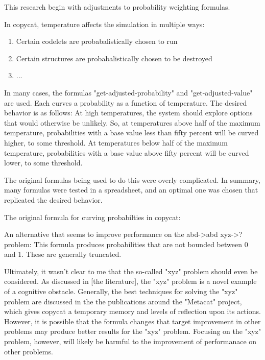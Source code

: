 \documentclass[a4paper]{article}
\begin{document}
This research begin with adjustments to probability weighting formulas.

In copycat, temperature affects the simulation in multiple ways:

\begin{enumerate}
    \item Certain codelets are probabalistically chosen to run
    \item Certain structures are probabalistically chosen to be destroyed
    \item ...
\end{enumerate}

In many cases, the formulas "get-adjusted-probability" and "get-adjusted-value" are used.
Each curves a probability as a function of temperature.
The desired behavior is as follows:
At high temperatures, the system should explore options that would otherwise be unlikely.
So, at temperatures above half of the maximum temperature, probabilities with a base value less than fifty percent will be curved higher, to some threshold.
At temperatures below half of the maximum temperature, probabilities with a base value above fifty percent will be curved lower, to some threshold.

The original formulas being used to do this were overly complicated.
In summary, many formulas were tested in a spreadsheet, and an optimal one was chosen that replicated the desired behavior.

The original formula for curving probabilties in copycat:


An alternative that seems to improve performance on the abd->abd xyz->? problem:
This formula produces probabilities that are not bounded between 0 and 1. These are generally truncated.


Ultimately, it wasn't clear to me that the so-called "xyz" problem should even be considered.
As discussed in [the literature], the "xyz" problem is a novel example of a cognitive obstacle. 
Generally, the best techniques for solving the "xyz" problem are discussed in the the publications around the "Metacat" project, which gives copycat a temporary memory and levels of reflection upon its actions.
However, it is possible that the formula changes that target improvement in other problems may produce better results for the "xyz" problem.
Focusing on the "xyz" problem, however, will likely be harmful to the improvement of performanace on other problems.
\end{document}
